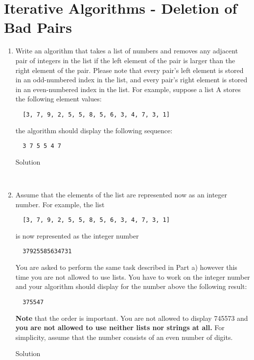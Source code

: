 \documentclass[11pt,a4paper]{article}
\begin{document}
\section{Iterative Algorithms - Deletion of Bad Pairs}
\begin{enumerate}[label=(\alph*)]
\item Write an algorithm that takes a list of numbers and removes any adjacent pair of integers in the list if the
left element of the pair is larger than the right element of the pair. Please note that every pair’s left element
is stored in an odd-numbered index in the list, and every pair’s right element is stored in an even-numbered
index in the list. For example, suppose a list A stores the following element values:
\begin{verbatim}
  [3, 7, 9, 2, 5, 5, 8, 5, 6, 3, 4, 7, 3, 1]
\end{verbatim}
the algorithm should display the following sequence:
\begin{verbatim}
  3 7 5 5 4 7
\end{verbatim}
  \begin{description}
    \item[Solution] \hfill \\
    
  \end{description}
\vfill

\item Assume that the elements of the list are represented now as an integer number. For example, the list
\begin{verbatim}
  [3, 7, 9, 2, 5, 5, 8, 5, 6, 3, 4, 7, 3, 1]
\end{verbatim}
is now represented as the integer number
\begin{verbatim}
  37925585634731
\end{verbatim}
You are asked to perform the same task described in Part a) however this time you are not allowed to use
lists. You have to work on the integer number and your algorithm should display for the number above the
following result:
\begin{verbatim}
  375547
\end{verbatim}
\textbf{Note} that the order is important. You are not allowed to display 745573 and \textbf{you are not allowed to use
neither lists nor strings at all.}
For simplicity, assume that the number consists of an even number of digits.
\vfill
\begin{description}
  \item[Solution] \hfill \\
  
\end{description}
\end{enumerate}
\end{document}
